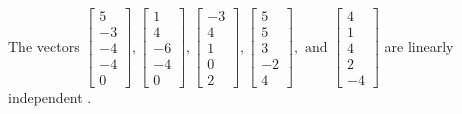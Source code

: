 \begin{exercise}
\begin{exerciseStatement}
  \end{exerciseStatement}
  \begin{exerciseAnswer}
   The vectors \(\left[\begin{array}{r}
5 \\
-3 \\
-4 \\
-4 \\
0
\end{array}\right] , \left[\begin{array}{r}
1 \\
4 \\
-6 \\
-4 \\
0
\end{array}\right] , \left[\begin{array}{r}
-3 \\
4 \\
1 \\
0 \\
2
\end{array}\right] , \left[\begin{array}{r}
5 \\
5 \\
3 \\
-2 \\
4
\end{array}\right] , \text{ and } \left[\begin{array}{r}
4 \\
1 \\
4 \\
2 \\
-4
\end{array}\right]\) are 
  	 linearly independent  .
  


  \end{exerciseAnswer}
\end{exercise}